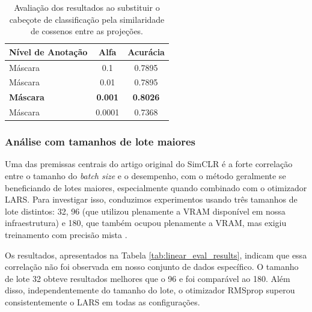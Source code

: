 \begin{table}[h] %
  \centering
  \caption{Avaliação dos resultados ao substituir o cabeçote de classificação pela similaridade de cossenos entre as projeções.}
  \label{tab:linear_eval_cosine}
  \setlength{\tabcolsep}{6pt}
  \begin{tabular}{lcc}
    \toprule
    Nível de Anotação & Alfa & Acurácia \\
    \midrule
    Máscara            & 0.1    & 0.7895 \\
    Máscara            & 0.01   & 0.7895 \\
    \textbf{Máscara}   & \textbf{0.001}  & \textbf{0.8026} \\
    Máscara            & 0.0001 & 0.7368 \\
    \bottomrule
  \end{tabular}
\end{table}


\subsubsection{Análise com tamanhos de lote maiores}

Uma das premissas centrais do artigo original do SimCLR é a forte correlação entre o tamanho do \textit{batch size} e o desempenho, com o método geralmente se beneficiando de lotes maiores, especialmente quando combinado com o otimizador LARS. Para investigar isso, conduzimos experimentos usando três tamanhos de lote distintos: 32, 96 (que utilizou plenamente a VRAM disponível em nossa infraestrutura) e 180, que também ocupou plenamente a VRAM, mas exigiu treinamento com precisão mista \cite{micikevicius2017mixed}.

Os resultados, apresentados na Tabela \ref{tab:linear_eval_results}, indicam que essa correlação não foi observada em nosso conjunto de dados específico. O tamanho de lote 32 obteve resultados melhores que o 96 e foi comparável ao 180. Além disso, independentemente do tamanho do lote, o otimizador RMSprop superou consistentemente o LARS em todas as configurações.

